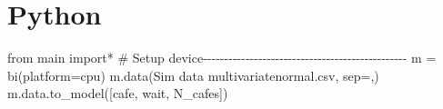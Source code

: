\documentclass[
  letterpaper,
  DIV=11,
  numbers=noendperiod]{scrreprt}
\newenvironment{Shaded}{\begin{snugshade}}{\end{snugshade}}
\newcommand{\CommentTok}[1]{\textcolor[rgb]{0.37,0.37,0.37}{#1}}
\newcommand{\ImportTok}[1]{\textcolor[rgb]{0.00,0.46,0.62}{#1}}
\newcommand{\NormalTok}[1]{\textcolor[rgb]{0.00,0.23,0.31}{#1}}
\newcommand{\OperatorTok}[1]{\textcolor[rgb]{0.37,0.37,0.37}{#1}}
\newcommand{\StringTok}[1]{\textcolor[rgb]{0.13,0.47,0.30}{#1}}
\begin{document}
\section{Python}

\begin{Shaded}
\begin{Highlighting}[]
\ImportTok{from}\NormalTok{ main }\ImportTok{import}\OperatorTok{*}
\CommentTok{\# Setup device{-}{-}{-}{-}{-}{-}{-}{-}{-}{-}{-}{-}{-}{-}{-}{-}{-}{-}{-}{-}{-}{-}{-}{-}{-}{-}{-}{-}{-}{-}{-}{-}{-}{-}{-}{-}{-}{-}{-}{-}{-}{-}{-}{-}{-}{-}{-}{-}}
\NormalTok{m }\OperatorTok{=}\NormalTok{ bi(platform}\OperatorTok{=}\StringTok{\textquotesingle{}cpu\textquotesingle{}}\NormalTok{)}
\NormalTok{m.data(}\StringTok{\textquotesingle{}Sim data multivariatenormal.csv\textquotesingle{}}\NormalTok{, sep}\OperatorTok{=}\StringTok{\textquotesingle{},\textquotesingle{}}\NormalTok{) }
\NormalTok{m.data.to\_model([}\StringTok{\textquotesingle{}cafe\textquotesingle{}}\NormalTok{, }\StringTok{\textquotesingle{}wait\textquotesingle{}}\NormalTok{, }\StringTok{\textquotesingle{}N\_cafes\textquotesingle{}}\NormalTok{])}


\end{Highlighting}
\end{Shaded}
\end{document}
